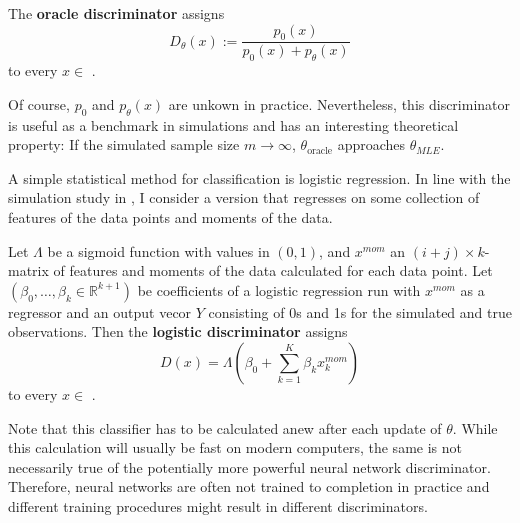 \begin{definition}
    The \textbf{oracle discriminator} assigns
    \begin{equation}
        D_\theta(x):=\frac{p_0(x)}{p_0(x)+p_\theta(x)} %
    \end{equation}
    to every $x \in$ . %
\end{definition}

Of course, $p_0$ and $p_\theta(x)$ are unkown in practice.
Nevertheless, this discriminator is useful as a benchmark in simulations and has an interesting theoretical property:
If the simulated sample size $m \rightarrow \infty$, $\theta_{\text{oracle}}$ approaches $\theta_{MLE}$. %

A simple statistical method for classification is logistic regression.
In line with the simulation study in \textcite{kaji2023adversarial}, I consider a version that regresses on some collection of features of the data points and moments of the data.

\begin{definition}
    Let $\Lambda$ be a sigmoid function with values in $(0,1)$, and $x^{mom}$ an $(i+j)\times k$-matrix of features and moments of the data calculated for each data point.
    Let $(\beta_0, \dots,\beta_k \in \mathbb{R}^{k+1})$ be coefficients of a logistic regression run with $x^{mom}$ as a regressor and an output vecor $Y$ consisting of 0s and 1s for the simulated and true observations. %
    Then the \textbf{logistic discriminator} assigns
    \begin{equation}
        D(x) = \Lambda(\beta_{0} + \sum_{k=1}^{K}\beta_{k} x_{k}^{mom}) %
    \end{equation}
    to every $x \in$ . %
\end{definition}

Note that this classifier has to be calculated anew after each update of $\theta$.
While this calculation will usually be fast on modern computers, the same is not necessarily true of the potentially more powerful neural network discriminator.
Therefore, neural networks are often not trained to completion in practice and different training procedures might result in different discriminators.

